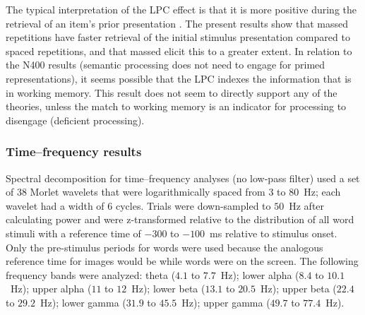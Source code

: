 The typical interpretation of the LPC effect is that it is more positive during the retrieval of an item's prior presentation \cite{OlicEtal2000,VanSEtal2007}.  The present results show that massed repetitions have faster retrieval of the initial stimulus presentation compared to spaced repetitions, and that massed elicit this to a greater extent.
In relation to the N400 results (semantic processing does not need to engage for primed representations), it seems possible that the LPC indexes the information that is in working memory.  This result does not seem to directly support any of the theories, unless the match to working memory is an indicator for processing to disengage (deficient processing).

\subsubsection{Time--frequency results}

Spectral decomposition for time--frequency analyses (no low-pass filter) used a set of $38$ Morlet wavelets that were logarithmically spaced from $3$ to $80$~Hz; each wavelet had a width of $6$ cycles.  Trials were down-sampled to $50$~Hz after calculating power and were z-transformed relative to the distribution of all word stimuli with a reference time of $-300$ to $-100$~ms relative to stimulus onset.
Only the pre-stimulus periods for words were used because the analogous reference time for images would be while words were on the screen.
The following frequency bands were analyzed: theta ($4.1$ to $7.7$~Hz); lower alpha ($8.4$ to $10.1$~Hz); upper alpha ($11$ to $12$~Hz); lower beta ($13.1$ to $20.5$~Hz); upper beta ($22.4$ to $29.2$~Hz); lower gamma ($31.9$ to $45.5$~Hz); upper gamma ($49.7$ to $77.4$~Hz).

